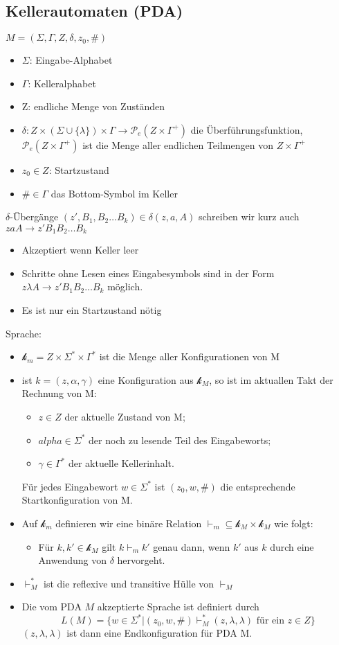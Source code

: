 \documentclass[9pt, a4paper]{article}
\begin{document}
 \subsection{Kellerautomaten (PDA)}
 $M = (\Sigma, \Gamma, Z, \delta, z_0, \#)$
 \begin{itemize}
 	\item $\Sigma$: Eingabe-Alphabet
 	\item $\Gamma$: Kelleralphabet
 	\item Z: endliche Menge von Zuständen
 	\item $\delta: Z \times (\Sigma \cup \{\lambda\}) \times \Gamma \to \mathcal{P}_e(Z \times \Gamma^+)$ die Überführungsfunktion, $\mathcal{P}_e(Z \times \Gamma^+)$ ist die Menge aller endlichen Teilmengen von $Z \times \Gamma^+$
 	\item $z_0 \in Z$: Startzustand
 	\item $\# \in \Gamma$ das Bottom-Symbol im Keller
 \end{itemize}
 $\delta$-Übergänge $(z', B_1,B_2 \dots B_k)\in \delta(z, a, A)$ schreiben wir kurz auch $zaA \to z'B_1B_2\dots B_k$
 \begin{itemize}
 	\item Akzeptiert wenn Keller leer
 	\item Schritte ohne Lesen eines Eingabesymbols  sind in der Form $z\lambda A \to z'B_1B_2 \dots B_k$ möglich.
 	\item Es ist nur ein Startzustand nötig
 \end{itemize}
 Sprache:
 \begin{itemize}
 	\item  $\mathcal{k}_m = Z \times \Sigma^* \times \Gamma^*$ ist die Menge aller Konfigurationen von M
 	\item ist $k = (z, \alpha, \gamma)$ eine Konfiguration aus $\mathcal{k}_M$, so ist im aktuallen Takt der Rechnung von M:
 	\begin{itemize}
 		\item $z \in Z$ der aktuelle Zustand von M;
 		\item $alpha \in \Sigma^*$ der noch zu lesende Teil des Eingabeworts;
 		\item $\gamma \in \Gamma^*$ der aktuelle Kellerinhalt.
 	\end{itemize}
 	Für jedes Eingabewort $w \in \Sigma^*$ ist $(z_0, w, \#)$ die entsprechende Startkonfiguration von M.
 	\item Auf $\mathcal{k}_m$ definieren wir eine binäre Relation $\vdash_m \subseteq \mathcal{k}_M \times \mathcal{k}_M$ wie folgt:
 	\begin{itemize}
 		\item Für $k, k' \in \mathcal{k}_M$ gilt $k \vdash_m k'$ genau dann, wenn $k'$ aus $k$ durch eine Anwendung von $\delta$ hervorgeht.
 	\end{itemize}
 	\item $\vdash^*_M$ ist die reflexive und transitive Hülle von $\vdash_M$
 	\item Die vom PDA $M$ akzeptierte Sprache ist definiert durch
 	$$L(M) = \{w \in \Sigma^*|(z_0, w, \#)\vdash^*_M (z, \lambda, \lambda) \text{ für ein } z \in Z\}$$
 	$(z, \lambda, \lambda)$ ist dann eine Endkonfiguration für PDA M.
 \end{itemize}
\end{document}
